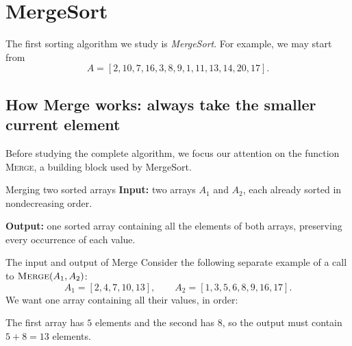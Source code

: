 \documentclass[a4paper,12pt,oneside]{report}
\begin{document}
\section{MergeSort}

The first sorting algorithm we study is \emph{MergeSort}.
For example, we may start from
\[
  A=[2,10,7,16,3,8,9,1,11,13,14,20,17].
\]
\subsection{How Merge works: always take the smaller current element}

Before studying the complete algorithm, we focus our attention on
the function \textsc{Merge}, a building block used by MergeSort.

\begin{framedproblem}{Merging two sorted arrays}
\textbf{Input:} two arrays $A_1$ and $A_2$, each already sorted in
nondecreasing order.

\textbf{Output:} one sorted array containing all the elements of both
arrays, preserving every occurrence of each value.
\end{framedproblem}

\begin{framedexample}{The input and output of Merge}
Consider the following separate example of a call to
$\textsc{Merge}(A_1,A_2)$:
\[
  A_1=[2,4,7,10,13],\qquad A_2=[1,3,5,6,8,9,16,17].
\]
We want one array containing all their values, in order:
\begin{center}
\end{center}
The first array has $5$ elements and the second has $8$, so the
output must contain $5+8=13$ elements.
\end{framedexample}
\end{document}
